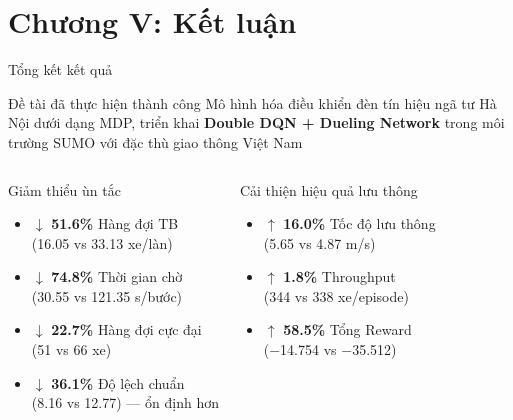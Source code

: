 \section{Chương V: Kết luận}

\begin{frame}{Tổng kết kết quả}
  \begin{block}{Đề tài đã thực hiện thành công}
    Mô hình hóa điều khiển đèn tín hiệu ngã tư Hà Nội dưới dạng MDP, triển khai \textbf{Double DQN + Dueling Network} trong môi trường SUMO với đặc thù giao thông Việt Nam
  \end{block}
  \vspace{8pt}
  \begin{columns}[T]
    \begin{alertblock}{Giảm thiểu ùn tắc}
      \begin{itemize}
        \item \alert{$\downarrow$ \textbf{51.6\%}} Hàng đợi TB\\
              (16.05 vs 33.13 xe/làn)
        \item \alert{$\downarrow$ \textbf{74.8\%}} Thời gian chờ\\
              (30.55 vs 121.35 s/bước)
        \item \alert{$\downarrow$ \textbf{22.7\%}} Hàng đợi cực đại\\
              (51 vs 66 xe)
        \item \alert{$\downarrow$ \textbf{36.1\%}} Độ lệch chuẩn\\
              (8.16 vs 12.77) --- ổn định hơn
      \end{itemize}
    \end{alertblock}

    \begin{exampleblock}{Cải thiện hiệu quả lưu thông}
      \begin{itemize}
        \item \textcolor{techgreen}{$\uparrow$ \textbf{16.0\%}} Tốc độ lưu thông\\
              (5.65 vs 4.87 m/s)
        \item \textcolor{techgreen}{$\uparrow$ \textbf{1.8\%}} Throughput\\
              (344 vs 338 xe/episode)
        \item \textcolor{techgreen}{$\uparrow$ \textbf{58.5\%}} Tổng Reward\\
              ($-$14.754 vs $-$35.512)
      \end{itemize}
    \end{exampleblock}
  \end{columns}
\end{frame}

